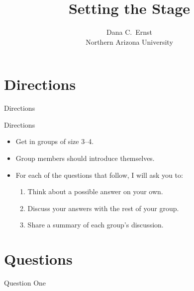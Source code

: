 \documentclass[10pt]{beamer}
\title{Setting the Stage}
\subtitle{}
\author{{\large Dana C.~Ernst}\\
Northern Arizona University}
\date{}
\begin{document}

\maketitle


\section{Directions}


\begin{frame}{Directions}

\vspace{3em}

\begin{block}{Directions}
\vspace{-.5em}
\begin{itemize}
\item Get in groups of size 3--4.
\item Group members should introduce themselves.
\item For each of the questions that follow, I will ask you to:
\begin{enumerate}
\item \alert{Think} about a possible answer on your own.
\item \alert{Discuss} your answers with the rest of your group.
\item \alert{Share} a summary of each group's discussion.
\end{enumerate}
\end{itemize}
\end{block}

\end{frame}


\section{Questions}


\begin{frame}{Question One}
\ 

\vfill


\vfill

\end{frame}
\end{document}
